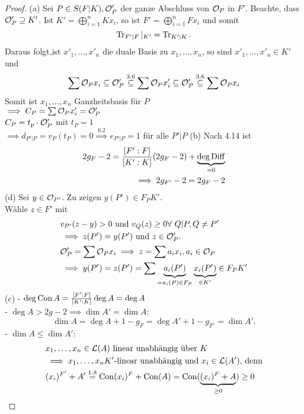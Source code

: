\begin{proof}
    (a) Sei $P \in S(F|K), \mathcal{O}'_P$ der ganze Abschluss von $\mathcal{O}_P$ in $F'$. Beachte, dass $\mathcal{O}'_P \supseteq K'$.
    Ist $K' = \bigoplus\limits_{i=1}^n Kx_i$, so ist $F' = \bigoplus\limits_{i=1}^n F x_i$ und somit 
    $$ \operatorname{Tr}_{F'|F}|_{K'} = \operatorname{Tr}_{K'|K}.$$
    Daraus folgt,ist $x'_1,\ldots,x'_n$ die duale Basis zu $x_1,\ldots,x_n$, so sind $x'_1,\ldots,x'_n \in K'$ und
    $$\sum \mathcal{O}_P x_i \subseteq \mathcal{O}'_P \stackrel{3.6}{\subseteq} \sum \mathcal{O}_Px'_i \subseteq \mathcal{O}'_P \stackrel{3.6}{\subseteq} \sum \mathcal{O}_Px_i$$
    Somit ist $x_1,\ldots,x_n$ Ganzheitsbasis für $P$\\
    $\implies C_P = \sum \mathcal{O}_P x'_i = \mathcal{O}'_P$\\
    $ C_P = t_p \cdot \mathcal{O}'_P$ mit $t_P = 1$\\
    $\implies d_{P'|P} = v_P(t_P)=0 \stackrel{6.2}{\implies} e_{P'|P} = 1$ für alle $P'|P$\nl
    (b) Nach 4.14 ist
    \begin{align*}
        2g_F - 2 = \frac{[F':F]}{[K':K]}(2g_F-2)+ \underbrace{\deg \operatorname{Diff}}_{=0} \\
        \implies 2 g_{F'}-2=2g_F-2
    \end{align*}
    (d) Sei $y \in \mathcal{O}_{P'}$. Zu zeigen $y(P') \in F_PK'$.\\
    Wähle $z \in F'$ mit 
    \begin{align*}
        &v_{P'}(z-y) > 0 \text{ und } v_Q(z) \geq 0 \forall~Q|P, Q\ne P'\\
        &\implies z(P')=y(P') \text{ und } z \in \mathcal{O}'_P. \\
        &\mathcal{O}'_P = \sum\mathcal{O}_Px_i \implies z = \sum a_ix_i, a_i \in \mathcal{O}_P\\
        &\implies y(P') = z(P') = \sum \underbrace{a_i(P')}_{=a_i(P)\in F_P}\underbrace{x_i(P')}_{\in K'} \in F_PK'
    \end{align*}
    (c) - $\deg \operatorname{Con} A = \frac{[F':F]}{[K':K]}\deg A = \deg A$\\
    - $\deg A > 2g -2 \implies \dim A' = \dim A$:
    $$ \dim A = \deg A + 1 - g_F = \deg A' + 1 - g_{F'} = \dim A'.$$
    - $\dim A \leq \dim A'$:
    \begin{align*}
        & x_1,\ldots,x_n \in \mathcal{L}(A) \text{ linear unabhängig über } K\\
        & \implies x_1,\ldots,x_n K'\text{-linear unabhängig und } x_i \in \mathcal{L}(A') \text{, denn}\\
        & (x_i)^{F'} + A' \stackrel{1.8}{=} \operatorname{Con}(x_i)^F + \operatorname{Con}(A) = \operatorname{Con} (\underbrace{(x_i)^F + A}_{\geq 0}) \geq 0
    \end{align*}

\end{proof}
